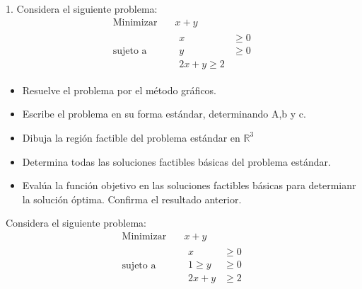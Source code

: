 \documentclass{article}
\begin{document}
1. Considera el siguiente problema:
\begin{equation*}
  \begin{aligned}
    \text{Minimizar}\quad & x+y\\
    \text{sujeto a}\quad  &
     \begin{aligned}
      x & \geq 0 \\
      y & \geq 0 \\
      2x+y \geq 2
     \end{aligned}
  \end{aligned}
\end{equation*}
\begin{itemize}
\item Resuelve el problema por el método gráficos.
\item Escribe el problema en su forma estándar, determinando A,b y c.
\item Dibuja la región factible del problema estándar en $\mathbb{R}^3$
\item Determina todas las soluciones factibles básicas del problema estándar.
\item Evalúa la función objetivo en las soluciones factibles básicas para determianr la solución óptima. Confirma el resultado anterior.
\end{itemize}
Considera el siguiente  problema:
\begin{equation*}
  \begin{aligned}
    \text{Minimizar}\quad  & x+y \\
    \text{sujeto a}\quad  &
  \begin{aligned}
    x & \geq 0\\ 
 1 \geq  y & \geq 0\\
2x + y & \geq 2
  \end{aligned}
  \end{aligned}
\end{equation*}
\end{document}
